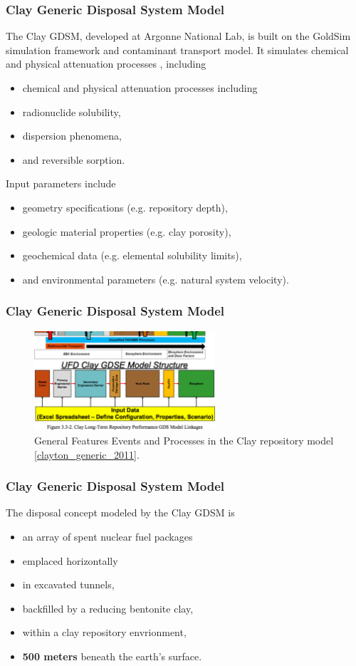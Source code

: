 \begin{frame}[c]
  \frametitle{Clay Generic Disposal System Model}
The Clay \gls{GDSM}, developed at Argonne National Lab, is built on the GoldSim 
simulation framework and contaminant transport model.  It simulates chemical and 
physical attenuation processes \cite{golder_goldsim_2010, 
golder_goldsim_ct_2010}, including 
\begin{itemize}
  \item  chemical and physical attenuation processes including
  \item radionuclide solubility,
  \item dispersion phenomena,
  \item and reversible sorption.
\end{itemize}

Input parameters include 
\begin{itemize}
  \item geometry specifications (e.g. repository depth),
  \item geologic material properties (e.g. clay porosity), 
  \item geochemical data (e.g. elemental solubility limits),
  \item and environmental parameters (e.g. natural system velocity). 
\end{itemize}
\end{frame}

\begin{frame}[c]
  \frametitle{Clay Generic Disposal System Model}
  \vspace{2cm}
\begin{figure}[h!]
\includegraphics[width=0.6\textwidth]{feps.eps}
\caption{General Features Events and Processes in the Clay repository model 
  \ref{clayton_generic_2011}.}
\end{figure}
\end{frame}

\begin{frame}[c]
  \frametitle{Clay Generic Disposal System Model}
The disposal concept modeled by the Clay \gls{GDSM} \cite{nutt_generic_2009} is
\begin{itemize}
  \item an array of spent nuclear fuel packages 
  \item emplaced horizontally
  \item in excavated tunnels, 
  \item backfilled by a reducing bentonite clay,
  \item within a clay repository envrionment, 
  \item \textbf{500 meters} beneath the earth's surface.
\end{itemize}
\end{frame}

